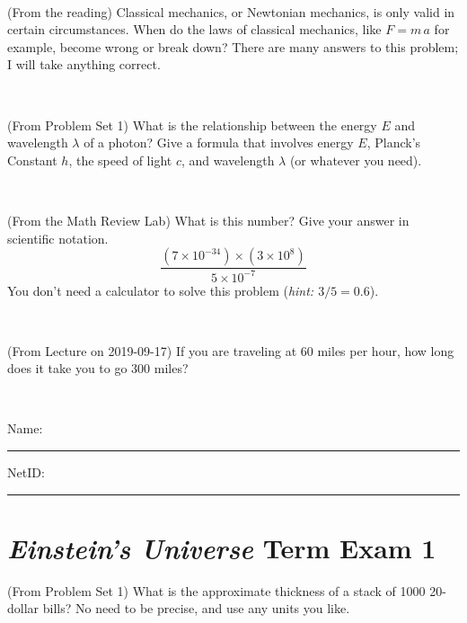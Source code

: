 \documentclass[12pt, letterpaper]{article}
\begin{document}
\vfill ~


\clearpage


\begin{problem} (From the reading)
Classical mechanics, or Newtonian mechanics, is only valid in certain
circumstances. When do the laws of classical mechanics, like $F =
m\,a$ for example, become wrong or break down? There are many answers
to this problem; I will take anything correct.
\end{problem}


\vfill ~

\begin{problem} (From Problem Set 1)
What is the relationship between the energy $E$ and wavelength
$\lambda$ of a photon? Give a formula that involves energy $E$,
Planck's Constant $h$, the speed of light $c$, and wavelength
$\lambda$ (or whatever you need).
\end{problem}

\vfill ~

\begin{problem} (From the Math Review Lab)
What is this number? Give your answer in scientific notation.
$$
\frac{(7\times10^{-34})\times(3\times10^8)}{5\times10^{-7}}
$$
You don't need a calculator to solve this problem (\textit{hint: $3/5=0.6$}).
\end{problem}


\vfill ~

\begin{problem} (From Lecture on 2019-09-17)
If you are traveling at 60 miles per hour, how long does
it take you to go 300 miles?
\end{problem}


\vfill ~


\cleardoublepage



\noindent
Name: \rule[-1ex]{0.60\textwidth}{0.1pt}
NetID: \rule[-1ex]{0.20\textwidth}{0.1pt}

\section*{\textsl{Einstein's Universe} Term Exam 1}
\setcounter{problem}{1}


\begin{problem} (From Problem Set 1)
What is the approximate thickness of a stack of 1000 20-dollar bills?
No need to be precise, and use any units you like.
\end{problem}


\vfill ~
\end{document}

